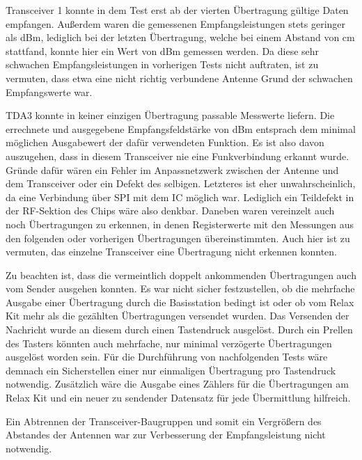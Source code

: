 Transceiver 1 konnte in dem Test erst ab der vierten Übertragung gültige Daten empfangen. Außerdem waren die gemessenen Empfangsleistungen stets geringer als \mbox{\unit[-100]{dBm}}, lediglich  bei der letzten Übertragung, welche bei einem Abstand von \unit[30]{cm} stattfand, konnte hier ein Wert von \unit[-97]{dBm} gemessen werden. Da diese  sehr schwachen Empfangsleistungen in vorherigen Tests nicht auftraten, ist zu vermuten, dass etwa eine nicht richtig verbundene Antenne  Grund der schwachen Empfangswerte war.

TDA3 konnte in keiner einzigen Übertragung passable Messwerte liefern. Die errechnete und ausgegebene Empfangsfeldstärke von \unit[-114]{dBm} entsprach dem minimal möglichen Ausgabewert der dafür verwendeten Funktion. Es ist also davon auszugehen, dass in diesem Transceiver nie eine Funkverbindung erkannt wurde. Gründe dafür wären ein Fehler im Anpassnetzwerk zwischen der Antenne und dem Transceiver oder ein Defekt des selbigen. Letzteres ist eher unwahrscheinlich, da eine Verbindung über \ac{SPI} mit dem \ac{IC} möglich war. Lediglich ein Teildefekt  in der RF-Sektion des Chips wäre also denkbar.
Daneben waren vereinzelt auch noch Übertragungen zu erkennen, in denen Registerwerte mit den Messungen aus den folgenden oder vorherigen Übertragungen übereinstimmten. Auch hier ist zu vermuten, das einzelne Transceiver eine Übertragung nicht erkennen konnten. 


Zu beachten ist, dass die vermeintlich doppelt ankommenden Übertragungen auch vom Sender ausgehen konnten. Es war nicht  sicher festzustellen, ob die mehrfache Ausgabe einer Übertragung durch die Basisstation  bedingt ist oder ob vom Relax Kit mehr als die gezählten Übertragungen versendet wurden. Das Versenden der Nachricht wurde an diesem durch einen Tastendruck ausgelöst.  Durch ein Prellen des Tasters könnten auch mehrfache, nur minimal verzögerte Übertragungen ausgelöst worden sein.
Für die Durchführung von nachfolgenden Tests wäre demnach ein Sicherstellen einer nur einmaligen Übertragung pro Tastendruck notwendig. Zusätzlich wäre die Ausgabe eines Zählers für die Übertragungen am Relax Kit und ein neuer zu sendender Datensatz für jede Übermittlung hilfreich.

Ein Abtrennen der Transceiver-Baugruppen und somit ein Vergrößern des Abstandes der Antennen war zur Verbesserung der Empfangsleistung nicht notwendig.